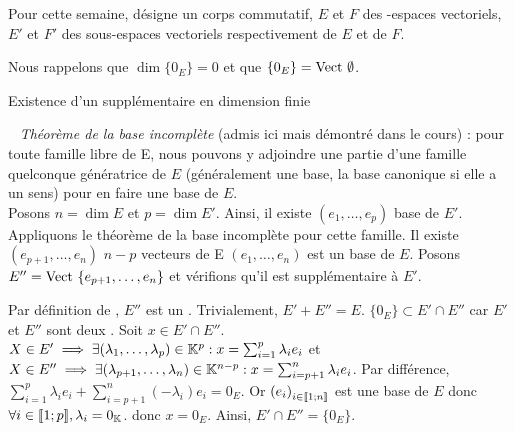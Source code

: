 \documentclass{article}
\renewenvironment{question_kholle}[2][ ]
{
	\subsection{\texorpdfstring{#2}{}}
	\notblank{#1}
	{
		\noindent #1
		\bigbreak
	}
	{}
	\begin{proof}
}
{
	\end{proof}
}
\begin{document}
Pour cette semaine, \K désigne un corps commutatif, $E$ et $F$ des \K\!\!-espaces vectoriels, $E'$ et $F'$ des sous-espaces vectoriels respectivement de $E$ et de $F$.

Nous rappelons que $\dim \{0_E\} = 0$ et que $\{0_E\} = \text{Vect } \emptyset$.

\begin{question_kholle}
  {Existence d'un supplémentaire en dimension finie}

  ~\newline
  \textit{Théorème de la base incomplète} (admis ici mais démontré dans le cours) : pour toute famille libre de E, nous pouvons y adjoindre une partie d'une famille quelconque génératrice de $E$ (généralement une base, la base canonique si elle a un sens) pour en faire une base de $E$. \\

  Posons $n = \dim E$ et $p = \dim E'$. Ainsi, il existe $(e_1, \ldots, e_p)$ base de $E'$.
  Appliquons le théorème de la base incomplète pour cette famille.
  Il existe $(e_{p+1}, \ldots, e_n)$ $n-p$ vecteurs de E \tq $(e_1, \ldots, e_n)$ est un base de $E$.
  Posons $E'' = \text{Vect } \{ e_{p+1}, \ldots, e_n \}$ et vérifions qu'il est supplémentaire à $E'$.

  Par définition de \Vect\!\!, $E''$ est un \sev.
  Trivialement, $E' + E'' = E$.
  $\{0_E\} \subset E' \cap E''$ car $E'$ et $E''$ sont deux \sevs.
  Soit $x \in E' \cap E''$.
  $X \in E' \implies \exists (\lambda_1, \ldots, \lambda_p) \in \mathbb K^p : x = \sum_{i=1}^{p} \lambda_i e_i$ et
  $X \in E'' \implies \exists (\lambda_{p+1}, \ldots, \lambda_n) \in \mathbb K^{n-p} : x = \sum_{i=p+1}^{n} \lambda_i e_i$.
  Par différence, $\sum_{i=1}^{p} \lambda_i e_i + \sum_{i=p+1}^{n} \left(-\lambda_i\right) e_i = 0_E$.
  Or $\left(e_i\right)_{i \in [\![ 1 ; n ]\!]}$ est une base de $E$ donc $\forall i \in [\![ 1 ; p ]\!], \lambda_i = 0_{\mathbb K}$.
  donc $x = 0_E$.
  Ainsi, $E' \cap E'' = \{0_E\}$.
\end{question_kholle}
\end{document}
